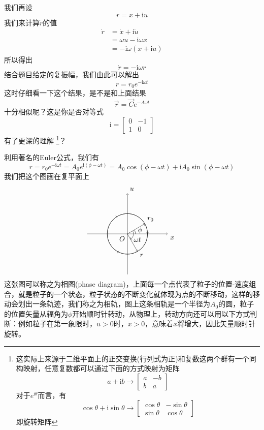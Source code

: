 \documentclass[UTF8]{ctexart}
\begin{document}
我们再设
\[r= x + \mathrm{i} u\]
我们来计算$\dot{r}$的值
\begin{align*}
    \dot{r}&= \dot{x} + \mathrm{i} \dot{u}\\
    &=\omega u-\mathrm{i} \omega x\\
    &=-\mathrm{i} \omega(x + \mathrm{i} u) 
\end{align*}
所以得出
\[\dot{r}=-\mathrm{i} \omega r\]
结合题目给定的复振幅，我们由此可以解出
\[r = r_0 e^{-\mathrm{i} \omega t } \]
这时仔细看一下这个结果，是不是和上面结果
\[\vec{r}=\vec{C}e^{-A \omega  t}\]
十分相似呢？这是你是否对等式
\[\mathrm{i} = \begin{bmatrix}
    0&-1\\
    1&0
\end{bmatrix}\]
有了更深的理解
\footnote{这实际上来源于二维平面上的正交变换(行列式为正)和复数这两个群有一个同构映射，任意复数都可以通过下面的方式映射为矩阵\[a+\mathrm{i} b\rightarrow \begin{bmatrix}a&-b\\b&a\end{bmatrix}\]对于$e^{\mathrm{i} \theta }$而言，有\[\cos\theta+\mathrm{i} \sin\theta \rightarrow \begin{bmatrix}\cos\theta&-\sin\theta\\\sin\theta&\cos\theta\end{bmatrix}\]即旋转矩阵}？

利用著名的Euler公式，我们有 
\[r = r_0 e^{-\mathrm{i} \omega t }= A_0e^{\mathrm{i}(\phi- \omega t)}= A_0 \cos{(\phi-\omega t )}+\mathrm{i} A_0 \sin{(\phi- \omega t) }\]
我们把这个图画在复平面上
\[
\begin{tikzpicture}
    \draw[->] (-2,0) -- (2,0); 
    \draw[->] (0,-2) -- (0,2);
    \draw[->] (0,0) -- (30:1);
    \draw[->] (0,0) -- (-60:1);
    \node[below right] (B) at (2,0) {$x$};
    \node[below right] (E) at (-15:0.2) {$\omega t$};
    \node[above right] (C) at (0,2) {$u$};
    \node[below left] (O) at (0,0) {$O$};
    \node[above right] (D) at (30:1) {$r_0$};
    \node[above right] (G) at (0.4,-0.1) {$\phi$};
    \node[below right] (F) at (-60:1) {$r$};
    \draw (0,0) circle (1cm);
    \draw[->] (240:1) arc [start angle=240, end angle=120, radius=1cm];
    \draw[->] (1,0) arc [start angle=360, end angle=240, radius=1cm];
    \draw[->] (120:1) arc [start angle=120, end angle=0, radius=1cm];
    \draw[->] (30:0.3) arc [start angle=30, end angle=-60, radius=0.3cm];
    \draw (0.4,0) arc [start angle=0, end angle=30, radius=0.4cm];
\end{tikzpicture}
\]
这张图可以称之为相图(phase diagram)，上面每一个点代表了粒子的位置-速度组合，就是粒子的一个状态，粒子状态的不断变化就体现为点的不断移动，这样的移动会划出一条轨迹，我们称之为相轨，图上这条相轨是一个半径为$A_0$的圆，粒子的位置矢量从辐角为$\phi$开始顺时针转动，从物理上，转动方向还可以用以下方式判断：例如粒子在第一象限时，$u > 0$时，$\dot{x}>0$，意味着$x$将增大，因此矢量顺时针旋转。
\end{document}
